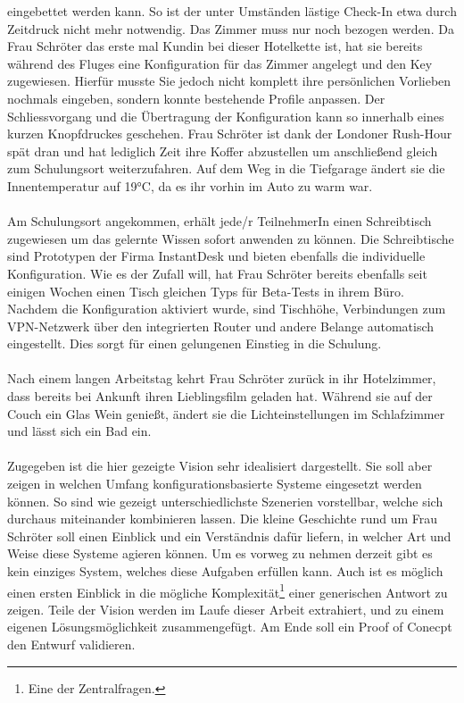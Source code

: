 eingebettet werden kann. So ist der unter Umständen lästige Check-In etwa durch Zeitdruck nicht mehr notwendig. Das Zimmer muss nur noch bezogen werden. Da Frau Schröter das
erste mal Kundin bei dieser Hotelkette ist, hat sie bereits während des Fluges eine Konfiguration für das Zimmer angelegt und den Key zugewiesen. Hierfür musste Sie jedoch 
nicht komplett ihre persönlichen Vorlieben nochmals eingeben, sondern konnte bestehende Profile anpassen. Der Schliessvorgang und die Übertragung der Konfiguration kann so 
innerhalb eines kurzen Knopfdruckes geschehen. Frau Schröter ist dank der Londoner Rush-Hour spät dran und hat lediglich Zeit ihre Koffer abzustellen um anschließend gleich
zum Schulungsort weiterzufahren. Auf dem Weg in die Tiefgarage ändert sie die Innentemperatur auf 19°C, da es ihr vorhin im Auto zu warm war. 
\\\\
Am Schulungsort angekommen, erhält jede/r TeilnehmerIn einen Schreibtisch zugewiesen um das gelernte Wissen sofort anwenden zu können. Die Schreibtische sind Prototypen der
Firma InstantDesk und bieten ebenfalls die individuelle Konfiguration. Wie es der Zufall will, hat Frau Schröter bereits ebenfalls seit einigen Wochen einen Tisch gleichen
Typs für Beta-Tests in ihrem Büro. Nachdem die Konfiguration aktiviert wurde, sind Tischhöhe, Verbindungen zum VPN-Netzwerk über den integrierten Router und andere 
Belange automatisch eingestellt. Dies sorgt für einen gelungenen Einstieg in die Schulung. 
\\\\
Nach einem langen Arbeitstag kehrt Frau Schröter zurück in ihr Hotelzimmer, dass bereits bei Ankunft ihren Lieblingsfilm geladen hat. Während sie auf der Couch ein Glas Wein 
genießt, ändert sie die Lichteinstellungen im Schlafzimmer und lässt sich ein Bad ein. 
\\\\
Zugegeben ist die hier gezeigte Vision sehr idealisiert dargestellt. Sie soll aber zeigen in welchen Umfang konfigurationsbasierte Systeme eingesetzt werden können. So sind 
wie gezeigt unterschiedlichste Szenerien vorstellbar, welche sich durchaus miteinander kombinieren lassen. Die kleine Geschichte rund um Frau Schröter soll einen Einblick und 
ein Verständnis dafür liefern, in welcher Art und Weise diese Systeme agieren können.  
Um es vorweg zu nehmen derzeit gibt es kein einziges System, welches diese Aufgaben erfüllen kann. Auch ist es möglich einen ersten Einblick in die mögliche 
Komplexität\footnote{Eine der Zentralfragen.} einer generischen Antwort zu zeigen. 
Teile der Vision werden im Laufe dieser Arbeit extrahiert, und zu einem eigenen Lösungsmöglichkeit zusammengefügt. Am Ende soll ein Proof of Conecpt den Entwurf validieren. 

